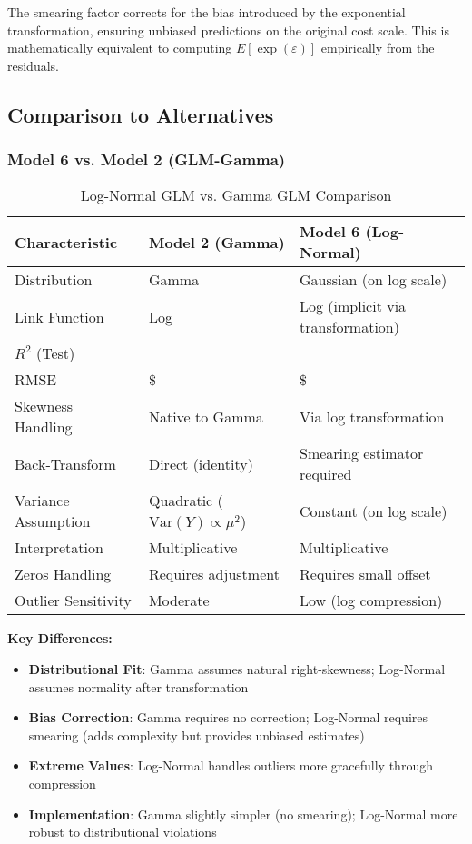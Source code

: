 The smearing factor corrects for the bias introduced by the exponential transformation, ensuring unbiased predictions on the original cost scale. This is mathematically equivalent to computing $E[\exp(\varepsilon)]$ empirically from the residuals.

\subsection{Comparison to Alternatives}

\subsubsection{Model 6 vs. Model 2 (GLM-Gamma)}

\begin{table}[h]
\centering
\caption{Log-Normal GLM vs. Gamma GLM Comparison}
\begin{tabular}{lll}
\toprule
\textbf{Characteristic} & \textbf{Model 2 (Gamma)} & \textbf{Model 6 (Log-Normal)} \\
\midrule
Distribution & Gamma & Gaussian (on log scale) \\
Link Function & Log & Log (implicit via transformation) \\
$R^2$ (Test) & \ModelTwoRSquaredTest{} & \MRSquaredTest{} \\
RMSE & \$\ModelTwoRMSETest{} & \$\MRMSETest{} \\
Skewness Handling & Native to Gamma & Via log transformation \\
Back-Transform & Direct (identity) & Smearing estimator required \\
Variance Assumption & Quadratic ($\text{Var}(Y) \propto \mu^2$) & Constant (on log scale) \\
Interpretation & Multiplicative & Multiplicative \\
Zeros Handling & Requires adjustment & Requires small offset \\
Outlier Sensitivity & Moderate & Low (log compression) \\
\bottomrule
\end{tabular}
\end{table}

\textbf{Key Differences:}

\begin{itemize}
    \item \textbf{Distributional Fit}: Gamma assumes natural right-skewness; Log-Normal assumes normality after transformation
    \item \textbf{Bias Correction}: Gamma requires no correction; Log-Normal requires smearing (adds complexity but provides unbiased estimates)
    \item \textbf{Extreme Values}: Log-Normal handles outliers more gracefully through compression
    \item \textbf{Implementation}: Gamma slightly simpler (no smearing); Log-Normal more robust to distributional violations
\end{itemize}

